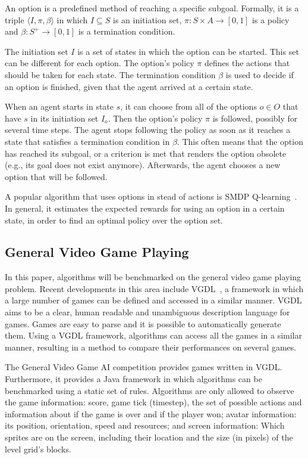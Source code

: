 An option is a predefined method of reaching a specific
subgoal. Formally, it is a triple $\langle I, \pi, \beta\rangle$ in which $I
\subseteq S$ is an initiation set, $\pi: S \times A \rightarrow [0, 1]$ is a
policy and $\beta: S^+ \rightarrow[0,1]$ is a termination condition.

The initiation set $I$ is a set of states in which the
option can be started. This set can be different for each option. The option's
policy $\pi$ defines the actions that should be taken for each state. The
termination condition $\beta$ is used to decide if an option is finished, given
that the agent arrived at a certain state.

When an agent starts in state $s$, it can choose from all of the options $o \in
O$ that have $s$ in its initiation set $I_o$. Then the option's policy $\pi$ is
followed, possibly for several time steps. The agent stops following the policy
as soon as it reaches a state that satisfies a termination condition in $\beta$.
This often means that the option has reached its subgoal, or a criterion is met
that renders the option obsolete (e.g., its goal does not exist anymore).
Afterwards, the agent chooses a new option that will be followed.

A popular algorithm that uses options in stead of actions is SMDP
Q-learning~\cite{sutton1999between}. In general, it estimates the expected
rewards for using an option in a certain state, in order to find an optimal
policy over the option set.

\subsection{General Video Game Playing}
\label{subsec:vgdl}
In this paper, algorithms will be benchmarked on the general video game playing
problem. Recent developments in this area include VGDL~\cite{schaul2013video}, a
framework in which a large number of games can be defined and accessed in a
similar manner.  VGDL aims to be a clear, human readable and unambiguous
description language for games. Games are easy to parse and it is possible to
automatically generate them. Using a VGDL framework, algorithms can access all
the games in a similar manner, resulting in a method to compare their
performances on several games.

The General Video Game AI competition provides games written in VGDL\@.
Furthermore, it provides a Java framework in which algorithms can be
benchmarked using a static set of rules. Algorithms are only allowed to observe
the game information: score, game tick (timestep), the set of possible actions
and information about if the game is over and if the player won; avatar
information: its position, orientation, speed and resources; and screen
information: Which sprites are on the screen, including their location and the
size (in pixels) of the level grid's blocks.

